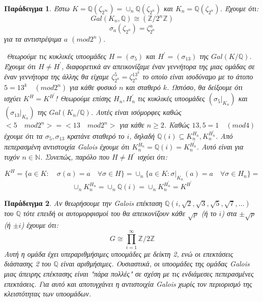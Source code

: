 \documentclass[oneside,a4paper]{article}
\newtheorem{example}{Παράδειγμα}
\newcommand {\tl}{\textlatin}
\newcommand{\Z}{\mathbb{Z}}
\newcommand{\Q}{\mathbb{Q}}
\begin{document}
\begin{example}
	Έστω $K = \mathbb{Q}(\zeta_{2^{\infty}}) = \cup_n \mathbb{Q} (\zeta_{2^n})$ και $K_n = \mathbb{Q}(\zeta_{2^n})$. Έχουμε ότι: 
	$$Gal(K_n,\Q ) \cong (\Z / 2^n \Z )$$
	$$\sigma_a (\zeta_{2^n}) = \zeta^a_{2^n}$$
	για τα αντιστρέψιμα $a$  $(mod2^n)$.

	$ $\newline %
	\noindent Θεωρούμε τις κυκλικές υποομάδες $H = (\sigma_5)$ και $H^{\prime} = (\sigma_{13})$ της $Gal(K/ \Q)$. Έχουμε ότι $H \neq H^{\prime}$, διαφορετικά αν απεικονίζαμε έναν γεννήτορα της μιας ομάδας σε έναν γεννήτορα της άλλης θα είχαμε $\zeta^5_{2^n} = \zeta^{13^k}_{2^n}$ το οποίο είναι ισοδύναμο με το άτοπο $5 = 13^k \quad (mod2^n)$ για κάθε φυσικό $n$ και σταθερό $k$.
	Ωστόσο, θα δείξουμε ότι ισχύει $K^H = K^{H^{\prime}}$! Θεωρούμε επίσης $H_n, H^{\prime}_n$ τις κυκλικές υποομάδες $(\sigma_5|_{K_n} )$ και $(\sigma_{13}|_{K_n})$ της $Gal(K_n / \Q)$. Αυτές είναι ισόμορφες καθώς $<5 \quad mod2^n> = < 13 \quad mod2^n>$ για κάθε $n\geq 2$. Καθώς $13,5 = 1\quad (mod4)$ έχουμε ότι τα $\sigma_5, \sigma_{13}$ κρατάνε σταθερό το $i$, δηλαδή $\Q (i) \subseteq K^{H_n}_n , K^{H^{\prime}_n}_n $. Από πεπερασμένη αντιστοιχία \tl{Galois} έχουμε ότι $K^{H_n}_n = \Q (i) = K^{H^{\prime}_n}_n$. Αυτό είναι για τυχόν $n \in \mathbb N$. Συνεπώς,  παρόλο που $H \neq H^{\prime}$ ισχύει ότι:
	
		$$K^H = \{a \in K : \quad \sigma (a) = a \quad\forall \sigma \in H\} = \cup_n \{a\in K: \sigma|_{K_n} (a) = a \quad\forall \sigma \in H_n\} = $$
		$$\cup_n K^{H_n}_n = \cup_n \Q (i) = \cup_n K^{H^{\prime}_n}_n = K^{H^{\prime}}$$
\end{example}

\vspace{0.3truecm}

\begin{example}
	Αν θεωρήσουμε την \tl{Galois} επέκταση $\Q (i, \sqrt 2 , \sqrt 3 , \sqrt 5 , \sqrt 7 , \ldots)$ του $\Q$ τότε επειδή οι αυτομορφισμοί του θα απεικονίζουν κάθε $\sqrt p$ (ή το $i$) στα $ \pm \sqrt p$ (ή $\pm i$) έχουμε ότι:
	$$G \cong \prod\limits_{i=1}^{\infty} \Z / 2 \Z$$
	Αυτή η ομάδα έχει υπεραριθμήσιμες υποομάδες με δείκτη 2, ενώ οι επεκτάσεις διάστασης 2 του $\Q$ είναι αριθμήσιμες. Ουσιαστικά, οι υποομάδες της ομάδας \tl{Galois} μιας άπειρης επέκτασης είναι "πάρα πολλές" σε σχέση με τις ενδιάμεσες πεπερασμένες επεκτάσεις. Για αυτό και αποτυγχάνει η αντιστοιχία \tl{Galois} χωρίς τον περιορισμό της κλειστότητας των υποομάδων.
\end{example}
\end{document}
